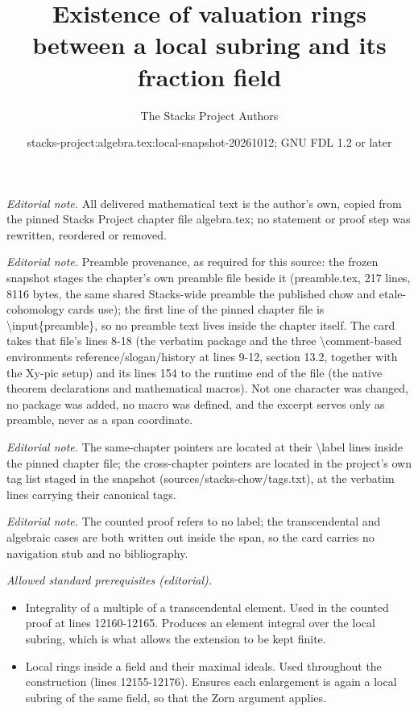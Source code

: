 \documentclass[10pt,a4paper]{amsart}
\title{Existence of valuation rings between a local subring and its fraction field}
\author{The Stacks Project Authors}
\date{stacks-project:algebra.tex:local-snapshot-20261012; GNU FDL 1.2 or later}
\theoremstyle{plain}
\theoremstyle{definition}
\theoremstyle{remark}
\numberwithin{equation}{subsection}
\begin{document}
\maketitle
\noindent\textit{Editorial note.} All delivered mathematical text is the author's own, copied from the pinned Stacks Project chapter file algebra.tex; no statement or proof step was rewritten, reordered or removed.\par\medskip
\noindent\textit{Editorial note.} Preamble provenance, as required for this source: the frozen snapshot stages the chapter's own preamble file beside it (preamble.tex, 217 lines, 8116 bytes, the same shared Stacks-wide preamble the published chow and etale-cohomology cards use); the first line of the pinned chapter file is \textbackslash{}input\{preamble\}, so no preamble text lives inside the chapter itself. The card takes that file's lines 8-18 (the verbatim package and the three \textbackslash{}comment-based environments reference/slogan/history at lines 9-12, section 13.2, together with the Xy-pic setup) and its lines 154 to the runtime end of the file (the native theorem declarations and mathematical macros). Not one character was changed, no package was added, no macro was defined, and the excerpt serves only as preamble, never as a span coordinate.\par\medskip
\noindent\textit{Editorial note.} The same-chapter pointers are located at their \textbackslash{}label lines inside the pinned chapter file; the cross-chapter pointers are located in the project's own tag list staged in the snapshot (sources/stacks-chow/tags.txt), at the verbatim lines carrying their canonical tags.\par\medskip
\noindent\textit{Editorial note.} The counted proof refers to no label; the transcendental and algebraic cases are both written out inside the span, so the card carries no navigation stub and no bibliography.\par\medskip
\noindent\textit{Allowed standard prerequisites (editorial).}\begin{itemize}
\item Integrality of a multiple of a transcendental element. Used in the counted proof at lines 12160-12165. Produces an element integral over the local subring, which is what allows the extension to be kept finite.
\item Local rings inside a field and their maximal ideals. Used throughout the construction (lines 12155-12176). Ensures each enlargement is again a local subring of the same field, so that the Zorn argument applies.
\end{itemize}\medskip
\end{document}
